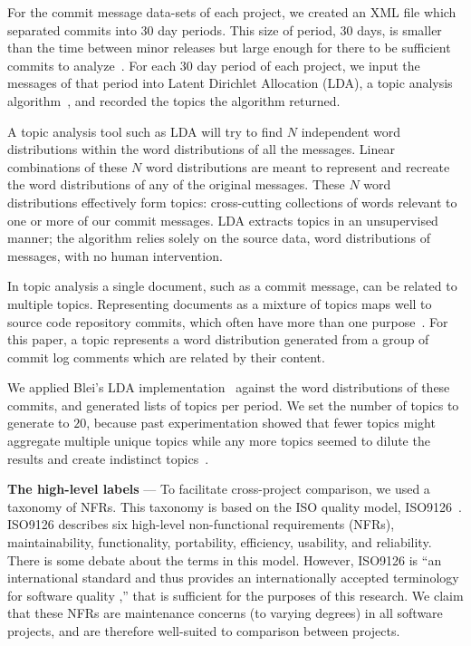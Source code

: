 \documentclass[]{sig-alternate}
\begin{document}
For the commit message data-sets of each project, we created an XML file which separated commits into 30 day periods. 
This size of period, 30 days, is smaller than the time between minor releases but large enough for there to be sufficient commits to analyze~\cite{Hindle09ICSM}. 
For each 30 day period of each project, we input the messages of that period into Latent Dirichlet Allocation (LDA), a topic analysis algorithm~\cite{Blei2003}, and recorded the topics the algorithm returned.

A topic analysis tool such as LDA will try to find $N$ independent word distributions within the word distributions of all the messages. 
Linear combinations of these $N$ word distributions are meant to represent and recreate the word distributions of any of the original messages. 
These $N$ word distributions effectively form topics: cross-cutting collections of words relevant to one or more of our commit messages. 
LDA extracts topics in an unsupervised manner; the algorithm relies solely on the source data, word distributions of messages, with no human intervention.

In topic analysis a single document, such as a commit message, can be related to multiple topics. 
Representing documents as a mixture of topics maps well to source code repository commits, which often have more than one purpose~\cite{Hindle09ICSM}.  
For this paper, a topic represents a word distribution generated from a group of commit log comments which are related by their content.  

We applied Blei's LDA implementation~\cite{Blei2003} against the word distributions of these commits, and generated lists of topics per period. 
We set the number of topics to generate to $20$, because past experimentation showed that fewer topics might aggregate multiple unique topics while any more topics seemed to dilute the results and create indistinct topics~\cite{Hindle09ICSM}. 

\noindent \textbf{The high-level labels} --- To facilitate cross-project comparison, we used a taxonomy of NFRs. This taxonomy is based on the ISO quality model, ISO9126~\cite{iso9126}. 
ISO9126 describes six high-level non-functional requirements (NFRs), maintainability, functionality, portability, efficiency, usability, and reliability. 
There is some debate about the terms in this model. 
However, ISO9126 is ``an international standard and thus provides an internationally accepted terminology for software quality \cite[p. 58]{Boegh2008},'' that is sufficient for the purposes of this research.  
We claim that these NFRs are maintenance concerns (to varying degrees) in all software projects, and are therefore well-suited to comparison between projects.
\end{document}
